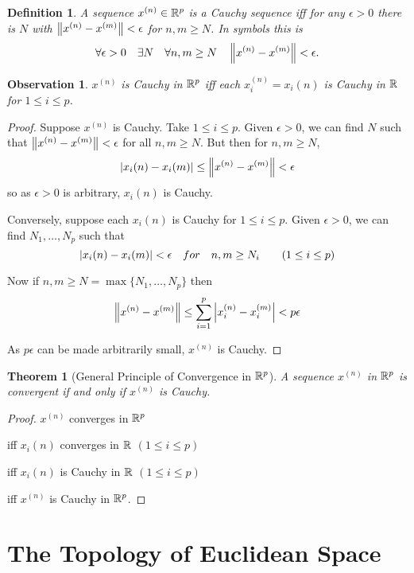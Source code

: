 \documentclass{notes}
\theoremstyle{plain}
\newtheorem{theorem}[proposition]{Theorem}
\newtheorem{observation}[proposition]{Observation}
\newtheorem{definition}[proposition]{Definition}
\newcommand{\Forall}[1]{\forall #1 \quad}
\newcommand{\Exists}[1]{\exists #1 \quad}
\begin{document}
\begin{definition}
A sequence $ x^{(n)} \in \mathbb{R}^{p} $ is a \emph{Cauchy sequence} iff 
for any $ \epsilon>0 $ there is $ N $ with
$ \left\|x^{(n)}-x^{(m)}\right\|< \epsilon$ for $ n, m \geq N $.  In symbols
this is
\[
\Forall{\epsilon>0}\Exists{N} \Forall {n,m \geq N} 
\norm{x^{(n)}-x^{(m)}}< \epsilon.
\]
\end{definition}

\begin{observation}
$ x^{(n)} $ is Cauchy in $ \mathbb{R}^{p} $ iff each $ 
x_{i}^{(n)}=x_{i}(n) $ is Cauchy in $ \mathbb{R} $ for $ 1 \leq i \leq p $.
\end{observation}

\begin{proof}
Suppose $ x^{(n)} $ is Cauchy. Take $ 1 \leq i \leq p $.
Given $ \epsilon>0 $, we can find $ N $ such that
$\left\|x^{(n)}-x^{(m)}\right\|< \epsilon$ for all $ n, m \geq N $. But 
then for $ n,m \geq N $,
\[
\left|x_{i}(n)-x_{i}(m)\right| \leq \left\|x^{(n)}-x^{(m)}\right\| < \epsilon
\]
so as $ \epsilon >0 $ is arbitrary, $ x_{i}(n) $ is Cauchy.

Conversely, suppose each $ x_{i}(n) $ is Cauchy for $ 1 \leq i \leq 
p $. Given $ \epsilon >0 $, we can find $ N_{1}, \ldots, N_{p} $ 
such that
\[
\left|x_{i}(n)-x_{i}(m)\right| < \epsilon \quad for \quad n,m \geq N_{i} 
\qquad (1 \leq i \leq p)
\]

Now if $n,m \geq N = \max\{N_{1}, \ldots, N_{p}\}$ then
\[
\left\|x^{(n)}-x^{(m)}\right\| \leq 
\sum_{i=1}^{p}\left|x_{i}^{(n)}-x_{i}^{(m)}\right| < p \epsilon
\]

As $ p \epsilon $ can be made arbitrarily small, $ x^{(n)} $ is Cauchy.
\end{proof}

\begin{theorem}[General Principle of Convergence in $ \mathbb{R}^{p} $]
A sequence $ x^{(n)} $ in $ \mathbb{R}^{p} $ is convergent if and only 
if $ x^{(n)} $ is Cauchy.
\end{theorem}

\begin{proof}
  $ x^{(n)} $ converges in $ \mathbb{R}^{p} $

iff $ x_{i}(n) $ converges in $\mathbb{R} $ $ (1 \leq i \leq p) $

iff $ x_{i}(n) $ is Cauchy in $ \mathbb{R} $ $ (1 \leq i \leq p) $

iff $ x^{(n)} $ is Cauchy in $ \mathbb{R}^{p} $.
\end{proof}


\section{The Topology of Euclidean Space}
\label{EuclidianTopology}
\end{document}
